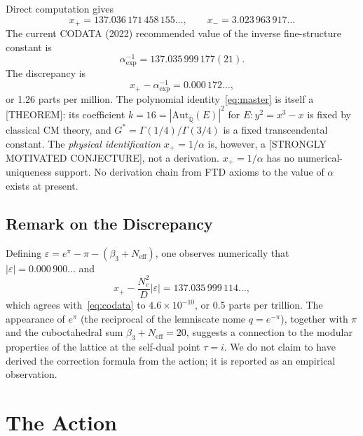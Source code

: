 \documentclass[12pt,a4paper]{article}
\begin{document}
Direct computation gives
\begin{equation}\label{eq:xvalues}
x_{+} = 137.036\,171\,458\,155\ldots, \qquad x_{-} = 3.023\,963\,917\ldots
\end{equation}
The current CODATA (2022) recommended value of the inverse fine-structure constant is~\cite{CODATA}
\begin{equation}\label{eq:codata}
\alpha^{-1}_{\mathrm{exp}} = 137.035\,999\,177(21).
\end{equation}
The discrepancy is
\begin{equation}\label{eq:gap}
x_{+} - \alpha^{-1}_{\mathrm{exp}} = 0.000\,172\ldots,
\end{equation}
or 1.26 parts per million. The polynomial identity~\eqref{eq:master} is itself a [THEOREM]: its coefficient $k = 16 = |\mathrm{Aut}_{\bar{\mathbb{Q}}}(E)|^{2}$ for $E\colon y^{2} = x^{3} - x$ is fixed by classical CM theory, and $G^{*} = \Gamma(1/4)/\Gamma(3/4)$ is a fixed transcendental constant. The \emph{physical identification} $x_{+} = 1/\alpha$ is, however, a [STRONGLY MOTIVATED CONJECTURE], not a derivation. $x_{+} = 1/\alpha$ has no numerical-uniqueness support. No derivation chain from FTD axioms to the value of $\alpha$ exists at present.

\subsection{Remark on the Discrepancy}

Defining $\varepsilon = e^{\pi} - \pi - (\beta_{3} + N_{\mathrm{eff}})$, one observes numerically that $|\varepsilon| = 0.000\,900\ldots$ and
\begin{equation}\label{eq:precision}
x_{+} - \frac{N_{c}^{2}}{D}|\varepsilon| = 137.035\,999\,114\ldots,
\end{equation}
which agrees with~\eqref{eq:codata} to $4.6 \times 10^{-10}$, or 0.5 parts per trillion. The appearance of $e^{\pi}$ (the reciprocal of the lemniscate nome $q = e^{-\pi}$), together with $\pi$ and the cuboctahedral sum $\beta_{3} + N_{\mathrm{eff}} = 20$, suggests a connection to the modular properties of the lattice at the self-dual point $\tau = i$. We do not claim to have derived the correction formula from the action; it is reported as an empirical observation.

\section{The Action}
\end{document}
